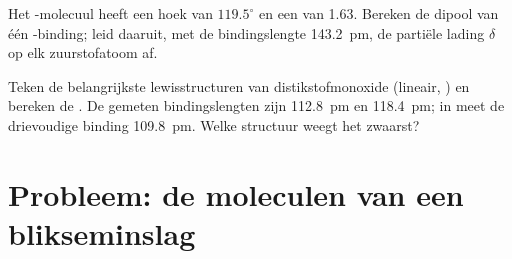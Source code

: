 \begin{exercise}[$\star\star\star$]\label{exo:b1:lewis-resonance-vsepr:11}
Het -molecuul heeft een hoek van $119.5^\circ$ en een
 van \qty{1.63}{\debye}. Bereken de dipool van één
-binding; leid daaruit, met de bindingslengte \qty{143.2}{pm},
de partiële lading $\delta$ op elk zuurstofatoom af.
\end{exercise}


\begin{exercise}[$\star\star\star$]\label{exo:b1:lewis-resonance-vsepr:12}
Teken de belangrijkste lewisstructuren van distikstofmonoxide 
(lineair, ) en bereken de . De gemeten
bindingslengten zijn  \qty{112.8}{pm} en 
\qty{118.4}{pm}; in  meet de drievoudige binding \qty{109.8}{pm}.
Welke structuur weegt het zwaarst?
\end{exercise}


\section{Probleem: de moleculen van een blikseminslag}

